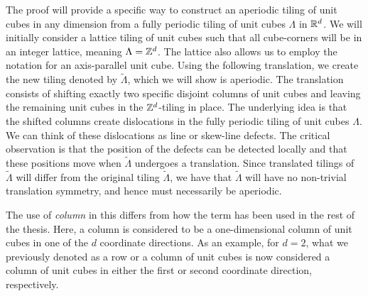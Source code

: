 \documentclass[../thesis.tex]{subfiles}
\begin{document}
The proof will provide a specific way to construct an aperiodic tiling of unit cubes in any dimension from a fully periodic tiling of unit cubes $\Lambda$ in $\mathbb{R}^d$. We will initially consider a lattice tiling of unit cubes such that all cube-corners will be in an integer lattice, meaning $\Lambda = \mathbb{Z}^d$. The lattice also allows us to employ the notation for an axis-parallel unit cube. Using the following translation, we create the new tiling denoted by $\widetilde{\Lambda}$, which we will show is aperiodic. The translation consists of shifting exactly two specific disjoint columns of unit cubes and leaving the remaining unit cubes in the $\mathbb{Z}^d$-tiling in place. The underlying idea is that the shifted columns create dislocations in the fully periodic tiling of unit cubes $\Lambda$. We can think of these dislocations as line or skew-line defects. The critical observation is that the position of the defects can be detected locally and that these positions move when $\widetilde{\Lambda}$ undergoes a translation. Since translated tilings of $\widetilde{\Lambda}$ will differ from the original tiling $\widetilde{\Lambda}$, we have that $\widetilde{\Lambda}$ will have no non-trivial translation symmetry, and hence must necessarily be aperiodic. 

\begin{remark}
    The use of \emph{column} in this  differs from how the term has been used in the rest of the thesis. Here, a column is considered to be a one-dimensional column of unit cubes in one of the $d$ coordinate directions. As an example, for $d=2$, what we previously denoted as a row or a column of unit cubes is now considered a column of unit cubes in either the first or second coordinate direction, respectively.
\end{remark}


\end{document}
